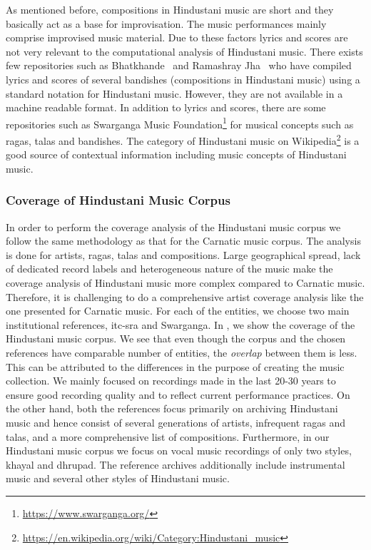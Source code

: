 As mentioned before, compositions in Hindustani music are short and they basically act as a base for improvisation. The music performances mainly comprise improvised music material. Due to these factors lyrics and scores are not very relevant to the computational analysis of Hindustani music. There exists few repositories such as Bhatkhande~\citep{Bhatkhande_1990} and Ramashray Jha~\citep{R_Jha_2001} who have compiled lyrics and scores of several bandishes (compositions in Hindustani music) using a standard notation for Hindustani music. However, they are not available in a machine readable format. In addition to lyrics and scores, there are some repositories such as Swarganga Music Foundation\footnote{\url{https://www.swarganga.org/}} for musical concepts such as \glspl{raga}, \glspl{tala} and bandishes. The category of Hindustani music on Wikipedia\footnote{\url{https://en.wikipedia.org/wiki/Category:Hindustani_music}} is a good source of contextual information including music concepts of Hindustani music.

\subsubsection{Coverage of Hindustani Music Corpus}
\label{sec:corpus_coverage_of_hindustani_music_corpus}

In order to perform the coverage analysis of the Hindustani music corpus we follow the same methodology as that for the Carnatic music corpus. The analysis is done for artists, \glspl{raga}, \glspl{tala} and compositions. Large geographical spread, lack of dedicated record labels and heterogeneous nature of the music make the coverage analysis of Hindustani music more complex compared to Carnatic music. Therefore, it is challenging to do a comprehensive artist coverage analysis like the one presented for Carnatic music. For each of the entities, we choose two main institutional references, \gls{itc-sra} and Swarganga. In , we show the coverage of the Hindustani music corpus. We see that even though the corpus and the chosen references have comparable number of entities, the \textit{overlap} between them is less. This can be attributed to the differences in the purpose of creating the music collection. We mainly focused on recordings made in the last 20-30 years to ensure good recording quality and to reflect current performance practices. On the other hand, both the references focus primarily on archiving Hindustani music and hence consist of several generations of artists, infrequent \glspl{raga} and \glspl{tala}, and a more comprehensive list of compositions. Furthermore, in our Hindustani music corpus we focus on vocal music recordings of only two styles, \gls{khayal} and \gls{dhrupad}. The reference archives additionally include instrumental music and several other styles of Hindustani music.


